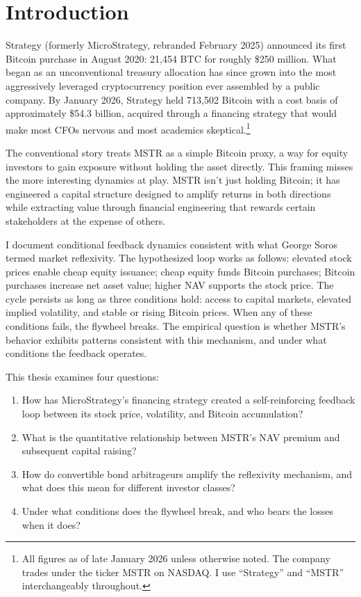 \section{Introduction}
\label{sec:introduction}

Strategy (formerly MicroStrategy, rebranded February 2025) announced its first Bitcoin purchase in August 2020: 21,454 BTC for roughly \$250 million. What began as an unconventional treasury allocation has since grown into the most aggressively leveraged cryptocurrency position ever assembled by a public company. By January 2026, Strategy held 713,502 Bitcoin with a cost basis of approximately \$54.3 billion, acquired through a financing strategy that would make most CFOs nervous and most academics skeptical.\footnote{All figures as of late January 2026 unless otherwise noted. The company trades under the ticker MSTR on NASDAQ. I use ``Strategy'' and ``MSTR'' interchangeably throughout.}

The conventional story treats MSTR as a simple Bitcoin proxy, a way for equity investors to gain exposure without holding the asset directly. This framing misses the more interesting dynamics at play. MSTR isn't just holding Bitcoin; it has engineered a capital structure designed to amplify returns in both directions while extracting value through financial engineering that rewards certain stakeholders at the expense of others.

I document conditional feedback dynamics consistent with what George Soros termed market reflexivity. The hypothesized loop works as follows: elevated stock prices enable cheap equity issuance; cheap equity funds Bitcoin purchases; Bitcoin purchases increase net asset value; higher NAV supports the stock price. The cycle persists as long as three conditions hold: access to capital markets, elevated implied volatility, and stable or rising Bitcoin prices. When any of these conditions fails, the flywheel breaks. The empirical question is whether MSTR's behavior exhibits patterns consistent with this mechanism, and under what conditions the feedback operates.

This thesis examines four questions:

\begin{enumerate}
    \item How has MicroStrategy's financing strategy created a self-reinforcing feedback loop between its stock price, volatility, and Bitcoin accumulation?
    \item What is the quantitative relationship between MSTR's NAV premium and subsequent capital raising?
    \item How do convertible bond arbitrageurs amplify the reflexivity mechanism, and what does this mean for different investor classes?
    \item Under what conditions does the flywheel break, and who bears the losses when it does?
\end{enumerate}

